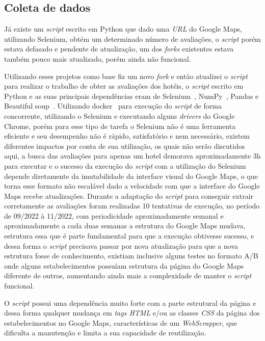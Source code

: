 \subsection{Coleta de dados}
\label{cap:metodologia:sec:conjunto_dados:sec:coleta_review}

Já existe um \emph{script} escrito em Python \cite{gaspa93scrapper2023} que dado uma \emph{URL} do Google Maps, utilizando Selenium, obtém um determinado número de avaliações, o \emph{script} porém estava defasado e pendente de atualização, um dos \emph{forks} existentes  estava também pouco mais atualizado, porém ainda não funcional.

Utilizando esses projetos como base fiz um novo \emph{fork} e então atualizei o \emph{script} para realizar o trabalho de obter as avaliações dos hotéis, o \emph{script} escrito em Python e as suas principais dependências eram de Selenium~\cite{selenium2023}, NumPy~\cite{harris2020array}, Pandas\cite{jeffreback20226702671} e Beautiful soup~\cite{richardson2007beautiful}. Utilizando docker~\cite{merkel2014docker} para execução do \emph{script} de forma concorrente, utilizando o Selenium e executando alguns \textit{drivers} do Google Chrome, porém para esse tipo de tarefa o Selenium não é uma ferramenta eficiente e seu desempenho não é rápido, satisfatório e nem necessário, existem diferentes impactos por conta de sua utilização, os quais não serão discutidos aqui, a busca das avaliações para apenas um hotel demorava aproximadamente 3h para executar e o sucesso da execução do \emph{script} com a utilização do Selenium depende diretamente da imutabilidade da interface visual do Google Maps, o que torna esse formato não escalável dado a velocidade com que a interface do Google Maps recebe atualizações. Durante a adaptação do \emph{script} para conseguir extrair corretamente as avaliações foram realizadas 10 tentativas de execução, no período de 09/2022 à 11/2022, com periodicidade aproximadamente semanal e aproximadamente a cada duas semanas a estrutura do Google Maps mudava, estrutura essa que é parte fundamental para que a execução obtivesse sucesso, e dessa forma o \emph{script} precisava passar por nova atualização para que a nova estrutura fosse de conhecimento, existiam inclusive alguns testes no formato A/B onde alguns estabelecimentos possuíam estrutura da página do Google Maps diferente de outros, aumentando ainda mais a complexidade de manter o \emph{script} funcional.

O \emph{script} possui uma dependência muito forte com a parte estrutural da página e dessa forma qualquer mudança em \emph{tags HTML} e/ou as classes \emph{CSS} da página dos estabelecimentos no Google Maps, características de um \emph{WebScrapper}, que dificulta a manutenção e limita a sua capacidade de reutilização.

